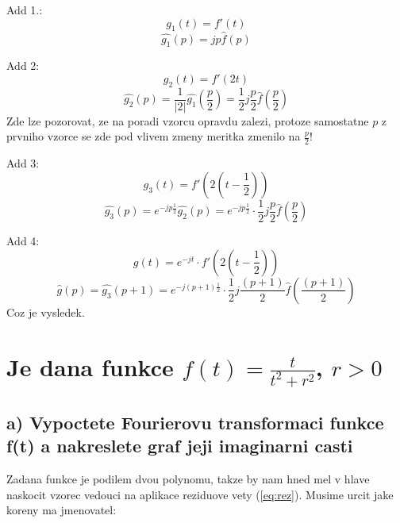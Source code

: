 Add 1.:
$$g_1(t) = f'(t)$$
$$\hat{g_1}(p) = jp\hat{f}(p)$$

Add 2:
$$g_2(t) = f'(2t)$$
$$\hat{g_2}(p) = \frac{1}{|2|}\hat{g_1}\left( \frac{p}{2}\right) = \frac{1}{2}j \frac{p}{2} \hat{f}\left( \frac{p}{2}\right)$$
Zde lze pozorovat, ze na poradi vzorcu opravdu zalezi, protoze samostatne $p$ z prvniho vzorce se zde pod vlivem zmeny meritka zmenilo na $\frac{p}{2}$!

Add 3:
$$g_3(t) = f'(2\left( t-\frac{1}{2}\right) )$$
$$\hat{g_3}(p) = e^{-jp\frac{1}{2}}\hat{g_2}(p) = e^{-jp\frac{1}{2}} \cdot \frac{1}{2}j \frac{p}{2} \hat{f}\left( \frac{p}{2}\right)$$

Add 4:
$$g(t)=e^{-jt}\cdot f'(2\left(t-\frac{1}{2}\right))$$
$$\hat{g}(p) = \hat{g_3}(p+1) = e^{-j(p+1)\frac{1}{2}} \cdot \frac{1}{2}j \frac{(p+1)}{2} \hat{f}\left( \frac{(p+1)}{2}\right)$$
Coz je vysledek.

\newpage

\section{Je dana funkce $f(t) = \frac{t}{t^2+r^2}$, $r>0$}

\subsection{a) Vypoctete Fourierovu transformaci funkce f(t) a nakreslete graf jeji imaginarni casti}

Zadana funkce je podilem dvou polynomu, takze by nam hned mel v hlave naskocit vzorec vedouci na aplikace reziduove vety (\ref{eq:rez}). Musime urcit jake koreny ma jmenovatel:

